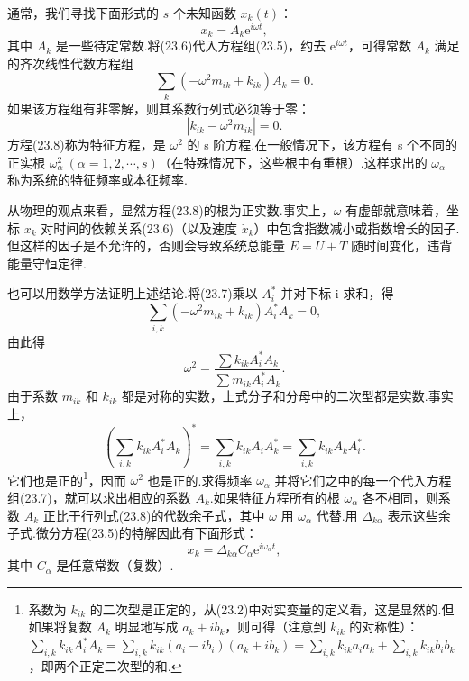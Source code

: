 通常，我们寻找下面形式的 $s$ 个未知函数 $x_k(t)$：
\begin{equation}
  x_k=A_k\mathrm{e}^{i\omega t},
\end{equation}
其中 $A_k$ 是一些待定常数.将(23.6)代入方程组(23.5)，约去 $\mathrm{e}^{i\omega t}$，可得常数 $A_k$ 满足的齐次线性代数方程组
\begin{equation}
  \sum_k\left(-\omega^2m_{ik}+k_{ik}\right)A_k=0.
\end{equation}
如果该方程组有非零解，则其系数行列式必须等于零：
\begin{equation}
  \left|k_{ik}-\omega^2m_{ik}\right|=0.
\end{equation}
方程(23.8)称为特征方程，是 $\omega^2$ 的 s 阶方程.在一般情况下，该方程有 s 个不同的正实根 $\omega_\alpha^2\ (\alpha=1,2,\cdots,s)$（在特殊情况下，这些根中有重根）.这样求出的 $\omega_\alpha$ 称为系统的特征频率或本征频率.

从物理的观点来看，显然方程(23.8)的根为正实数.事实上，$\omega$ 有虚部就意味着，坐标 $x_k$ 对时间的依赖关系(23.6)（以及速度 $\dot{x}_k$）中包含指数减小或指数增长的因子.但这样的因子是不允许的，否则会导致系统总能量 $E=U+T$ 随时间变化，违背能量守恒定律.

也可以用数学方法证明上述结论.将(23.7)乘以 $A_i^*$ 并对下标 i 求和，得
\begin{equation*}
  \sum_{i,k}\left(-\omega^2m_{ik}+k_{ik}\right)A_i^*A_k=0,
\end{equation*}
由此得
\begin{equation*}
  \omega^2=\frac{\sum k_{ik}A_i^*A_k}{\sum m_{ik}A_i^*A_k}.
\end{equation*}
由于系数 $m_{ik}$ 和 $k_{ik}$ 都是对称的实数，上式分子和分母中的二次型都是实数.事实上，
\begin{equation*}
  \left(\sum_{i,k}k_{ik}A_i^*A_k\right)^*
  =\sum_{i,k}k_{ik}A_iA_k^*
  =\sum_{i,k}k_{ik}A_kA_i^*.
\end{equation*}
它们也是正的\footnote{系数为 $k_{ik}$ 的二次型是正定的，从(23.2)中对实变量的定义看，这是显然的.但如果将复数 $A_k$ 明显地写成 $a_k+ib_k$，则可得（注意到 $k_{ik}$ 的对称性）：$\sum_{i,k}k_{ik}A_i^*A_k=\sum_{i,k}k_{ik}(a_i-ib_i)(a_k+ib_k)=\sum_{i,k}k_{ik}a_ia_k+\sum_{i,k}k_{ik}b_ib_k$，即两个正定二次型的和.}，因而 $\omega^2$ 也是正的.求得频率 $\omega_\alpha$ 并将它们之中的每一个代入方程组(23.7)，就可以求出相应的系数 $A_k$.如果特征方程所有的根 $\omega_\alpha$ 各不相同，则系数 $A_k$ 正比于行列式(23.8)的代数余子式，其中 $\omega$ 用 $\omega_\alpha$ 代替.用 $\Delta_{k\alpha}$ 表示这些余子式.微分方程(23.5)的特解因此有下面形式：
\begin{equation*}
  x_k=\Delta_{k\alpha}C_\alpha\mathrm{e}^{i\omega_\alpha t},
\end{equation*}
其中 $C_\alpha$ 是任意常数（复数）.

